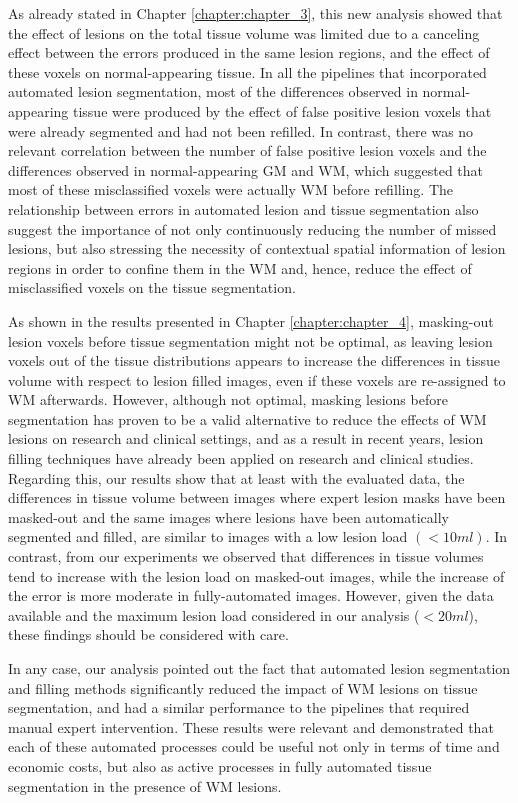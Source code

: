 As already stated in Chapter \ref{chapter:chapter_3}, this new analysis showed that the effect of lesions on the total tissue volume was limited due to a canceling effect between the errors produced in the same lesion regions, and the effect of these voxels on normal-appearing tissue. In all the pipelines that incorporated automated lesion segmentation, most of the differences observed in normal-appearing tissue were produced by the effect of false positive lesion voxels that were already segmented and had not been refilled. In contrast, there was no relevant correlation between the number of false positive lesion voxels and the differences observed in normal-appearing GM and WM, which suggested that most of these misclassified voxels were actually WM before refilling. The relationship between errors in automated lesion and tissue segmentation also suggest the importance of not only continuously reducing the number of missed lesions, but also stressing the necessity of contextual spatial information of lesion regions in order to confine them in the WM and, hence, reduce the effect of misclassified voxels on the tissue segmentation.

As shown in the results presented in Chapter \ref{chapter:chapter_4}, masking-out lesion voxels before tissue segmentation might not be optimal, as leaving lesion voxels out of the tissue distributions appears to increase the differences in tissue volume with respect to lesion filled images, even if these voxels are re-assigned to WM afterwards. However, although not optimal, masking lesions before segmentation has proven to be a valid alternative to reduce the effects of WM lesions on research and clinical settings, and as a result in recent years, lesion filling techniques have already been applied on research and clinical studies. Regarding this, our results show that at least with the evaluated data, the differences in tissue volume between images where expert lesion masks have been masked-out and the same images where lesions have been automatically segmented and filled, are similar to images with a low lesion load $(<10ml)$. In contrast, from our experiments we observed that differences in tissue volumes tend to increase with the lesion load on masked-out images, while the increase of the error is more moderate in  fully-automated images. However, given the data available and the maximum lesion load considered in our analysis ($<20ml$), these findings should be considered with care. 

In any case, our analysis pointed out the fact that automated lesion segmentation and filling methods significantly reduced the impact of WM lesions on tissue segmentation, and had a similar performance to the pipelines that required manual expert intervention. These results were relevant and demonstrated that each of these automated processes could be useful not only in terms of time and economic costs, but also as active processes in fully automated tissue segmentation in the presence of WM lesions.

